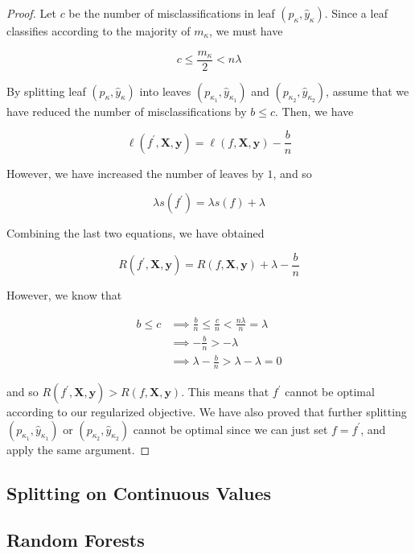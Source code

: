 \documentclass{article}
\theoremstyle{definition}
\begin{document}
  \begin{proof}
  Let $c$ be the number of misclassifications in leaf $(p_{\kappa}, \hat{y}_{\kappa})$. Since a leaf classifies according to the majority of $m_{\kappa}$, we must have 

    \[c \leq \frac{m_\kappa}{2} < n \lambda\]

  By splitting leaf $(p_\kappa, \hat{y}_\kappa)$ into leaves $(p_{\kappa_1}, \hat{y}_{\kappa_1})$ and $(p_{\kappa_2}, \hat{y}_{\kappa_2})$, assume that we have reduced the number of misclassifications by $b \leq c$. Then, we have 

    \[\ell(f^\prime, \mathbf{X}, \mathbf{y}) = \ell(f, \mathbf{X}, \mathbf{y}) - \frac{b}{n}\]

  However, we have increased the number of leaves by $1$, and so 

    \[\lambda s(f^\prime) = \lambda s(f) + \lambda\]

  Combining the last two equations, we have obtained 

    \[R (f^\prime, \mathbf{X}, \mathbf{y}) = R(f, \mathbf{X}, \mathbf{y}) + \lambda - \frac{b}{n}\]

  However, we know that 

  \begin{align*}
    b \leq c & \implies \frac{b}{n} \leq \frac{c}{n} < \frac{n \lambda}{n} = \lambda \\
    & \implies - \frac{b}{n} > - \lambda \\
    & \implies \lambda - \frac{b}{n} > \lambda - \lambda = 0
  \end{align*}

  and so $R (f^\prime, \mathbf{X}, \mathbf{y}) > R(f, \mathbf{X}, \mathbf{y})$. This means that $f^\prime$ cannot be optimal according to our regularized objective. We have also proved that further splitting $(p_{\kappa_1}, \hat{y}_{\kappa_1})$ or $(p_{\kappa_2}, \hat{y}_{\kappa_2})$ cannot  be optimal since we can just set $f = f^\prime$, and apply the same argument. 
  \end{proof}

  \subsection{Splitting on Continuous Values}



  \subsection{Random Forests}
\end{document}
